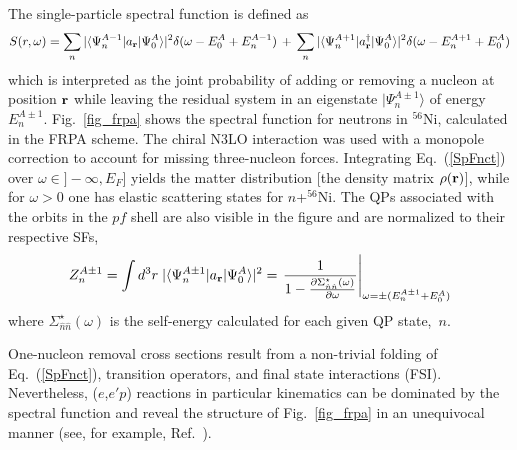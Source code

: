 \documentclass{ws-mpla}
\begin{document}
The single-particle spectral function is defined as
\begin{equation}
  S(r,\omega) = %
  \sum_n  |\langle \Psi^{A-1}_n | a_{\bf r} | \Psi^{A}_0 \rangle |^2 
                     \delta(\omega-E^A_0+E_n^{A-1}) \, + \,
  \sum_n  |\langle \Psi^{A+1}_n | a^\dag_{\bf r} | \Psi^{A}_0 \rangle |^2 
                     \delta(\omega-E_n^{A+1}+E^A_0) 
\label{SpFnct}
\end{equation}
which is interpreted as the joint probability of adding or removing a nucleon
at position ${\bf r}$ while leaving the residual system in an eigenstate
$|\Psi^{A\pm1}_n\rangle$ of energy $E_n^{A\pm1}$. Fig.~\ref{fig_frpa} shows
the spectral function for neutrons in $^{56}$Ni,  calculated
in the FRPA scheme.\cite{bar.09c}
The chiral N3LO interaction\cite{Ent.03} was used with a monopole correction
to account for missing three-nucleon forces.
%
Integrating Eq.~(\ref{SpFnct}) over $\omega\in]-\infty,E_F]$ yields
the matter distribution [the density matrix $\rho({\bf r})$], while
for $\omega>0$ one has elastic scattering states for $n$+$^{56}$Ni.
The QPs associated with the orbits in the $pf$ shell are also visible in the
figure and are normalized to their respective SFs,
\begin{equation}
Z^{A\pm1}_n  = \int d^3 r \; |\langle \Psi^{A\pm1}_n | a_{\bf r} | \Psi^{A}_0 \rangle |^2 =
  \left.
  \frac{1}{  1   -
  \frac{\partial \Sigma^\star_{\hat n \hat n}(\omega)}{\partial \omega}
  } \right\vert_{\omega=\pm(E_n^{A\pm1}+E^A_0)}
\label{eq:sf}
\end{equation}
where $\Sigma^\star_{\hat n \hat n}(\omega)$ is the self-energy calculated for each given QP state,~$n$.

One-nucleon removal cross sections result from a non-trivial folding of Eq.~(\ref{SpFnct}), transition operators, and final state interactions (FSI). Nevertheless, ($e$,$e'p$) reactions in particular kinematics can be dominated by the spectral function\cite{pvbook,bar.04b} and reveal the structure of Fig.~\ref{fig_frpa} in an
unequivocal manner (see, for example, Ref.~).
\end{document}
